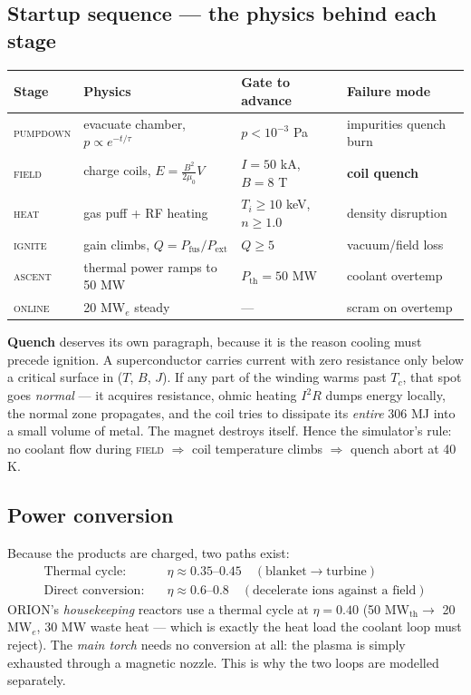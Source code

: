 \documentclass[11pt]{article}
\begin{document}
\subsection{Startup sequence --- the physics behind each stage}
\begin{center}\small
\begin{tabular}{@{}llll@{}}
\toprule
Stage & Physics & Gate to advance & Failure mode\\
\midrule
\textsc{pumpdown} & evacuate chamber, $p\propto e^{-t/\tau}$ & $p<10^{-3}$ Pa & impurities quench burn\\
\textsc{field} & charge coils, $E=\tfrac{B^2}{2\mu_0}V$ & $I=50$ kA, $B=8$ T & \textbf{coil quench}\\
\textsc{heat} & gas puff + RF heating & $T_i\ge10$ keV, $n\ge1.0$ & density disruption\\
\textsc{ignite} & gain climbs, $Q=P_{\text{fus}}/P_{\text{ext}}$ & $Q\ge5$ & vacuum/field loss\\
\textsc{ascent} & thermal power ramps to 50 MW & $P_{\text{th}}=50$ MW & coolant overtemp\\
\textsc{online} & 20 MW$_e$ steady & --- & scram on overtemp\\
\bottomrule
\end{tabular}
\end{center}

\textbf{Quench} deserves its own paragraph, because it is the reason cooling must precede ignition. A superconductor carries current with zero resistance only below a critical surface in ($T$, $B$, $J$). If any part of the winding warms past $T_c$, that spot goes \emph{normal} --- it acquires resistance, ohmic heating $I^2R$ dumps energy locally, the normal zone propagates, and the coil tries to dissipate its \emph{entire} 306 MJ into a small volume of metal. The magnet destroys itself. Hence the simulator's rule: no coolant flow during \textsc{field} $\Rightarrow$ coil temperature climbs $\Rightarrow$ quench abort at 40 K.

\subsection{Power conversion}
Because the products are charged, two paths exist:
\begin{align}
\text{Thermal cycle:}\quad & \eta \approx 0.35\text{--}0.45 \quad(\text{blanket}\to\text{turbine}) \\
\text{Direct conversion:}\quad & \eta \approx 0.6\text{--}0.8 \quad(\text{decelerate ions against a field})
\end{align}
ORION's \emph{housekeeping} reactors use a thermal cycle at $\eta=0.40$ (50 MW$_{\text{th}}\to$ 20 MW$_e$, 30 MW waste heat --- which is exactly the heat load the coolant loop must reject). The \emph{main torch} needs no conversion at all: the plasma is simply exhausted through a magnetic nozzle. This is why the two loops are modelled separately.
\end{document}
